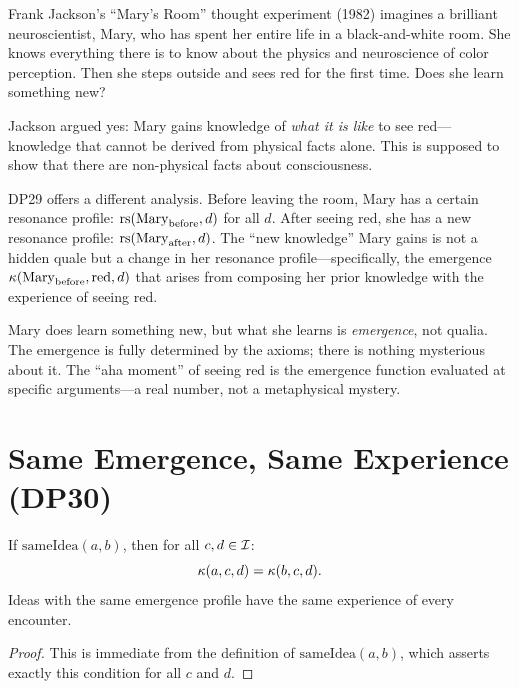 \begin{interpretation}
\label{interp:marys-room}
Frank Jackson's ``Mary's Room'' thought experiment (1982) imagines a
brilliant neuroscientist, Mary, who has spent her entire life in a
black-and-white room.  She knows everything there is to know about the
physics and neuroscience of color perception.  Then she steps outside
and sees red for the first time.  Does she learn something new?

Jackson argued yes: Mary gains knowledge of \emph{what it is like} to
see red---knowledge that cannot be derived from physical facts alone.
This is supposed to show that there are non-physical facts about
consciousness.

DP29 offers a different analysis.  Before leaving the room, Mary has
a certain resonance profile: $\mathrm{rs}(\mathrm{Mary}_{\mathrm{before}}, d)$
for all $d$.  After seeing red, she has a new resonance profile:
$\mathrm{rs}(\mathrm{Mary}_{\mathrm{after}}, d)$.  The ``new knowledge'' Mary
gains is not a hidden quale but a change in her resonance
profile---specifically, the emergence $\kappa(\mathrm{Mary}_{\mathrm{before}},
\mathrm{red}, d)$ that arises from composing her prior knowledge with
the experience of seeing red.

Mary does learn something new, but what she learns is \emph{emergence},
not qualia.  The emergence is fully determined by the axioms; there is
nothing mysterious about it.  The ``aha moment'' of seeing red is the
emergence function evaluated at specific arguments---a real number, not
a metaphysical mystery.
\end{interpretation}

\section{Same Emergence, Same Experience (DP30)}

\begin{theorem}
\label{thm:same-emergence-experience}
If $\mathrm{sameIdea}(a, b)$, then for all $c, d \in \mathcal{I}$:
\[
\kappa(a, c, d) = \kappa(b, c, d).
\]
Ideas with the same emergence profile have the same experience of
every encounter.
\end{theorem}

\begin{proof}
This is immediate from the definition of $\mathrm{sameIdea}(a, b)$,
which asserts exactly this condition for all $c$ and $d$.
\end{proof}

